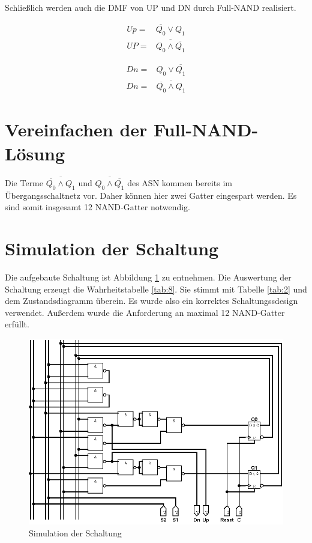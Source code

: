 \documentclass[
    paper=a4,
]{scrartcl}
\begin{document}
    Schließlich werden auch die DMF von UP und DN durch Full-NAND realisiert.

    \begin{align*}
        Up =& \overline{Q_0} \vee Q_1\\
        UP =& \overline{Q_0 \wedge \overline{Q_1}}
    \end{align*}

    \begin{align*}
        Dn =& Q_0 \vee \overline{Q_1}\\
        Dn =& \overline{\overline{Q_0} \wedge Q_1}
    \end{align*}

\section{Vereinfachen der Full-NAND-Lösung}
    Die Terme \(\overline{\overline{Q_0} \wedge Q_1}\) und \(\overline{Q_0 \wedge \overline{Q_1}}\) des ASN kommen bereits im Übergangsschaltnetz vor. Daher können hier zwei Gatter eingespart werden. Es sind somit insgesamt 12 NAND-Gatter notwendig.

\section{Simulation der Schaltung}
    Die aufgebaute Schaltung ist Abbildung \ref{fig:1} zu entnehmen. Die Auswertung der Schaltung erzeugt die Wahrheitstabelle \ref{tab:8}. Sie stimmt mit Tabelle \ref{tab:2} und dem Zustandsdiagramm überein. Es wurde also ein korrektes Schaltungssdesign verwendet. Außerdem wurde die Anforderung an maximal 12 NAND-Gatter erfüllt.

    \begin{figure}
        \centering
        \includegraphics[width=\textwidth]{schaltung.png}
        \caption{Simulation der Schaltung}
        \label{fig:1}
    \end{figure}
\end{document}
